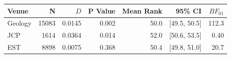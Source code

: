 \begin{tabular}{lrrrrrr}
  \toprule
Venue & N & $D$ & P Value & Mean Rank & 95\% CI & $BF_{01}$ \\ 
  \midrule
Geology & 15083 & 0.0145 & 0.002 & 50.0 & [49.5, 50.5] & 112.3 \\ 
JCP & 1614 & 0.0364 & 0.014 & 52.0 & [50.6, 53.5] & 0.40 \\ 
EST & 8898 & 0.0075 & 0.368 & 50.4 & [49.8, 51.0] & 20.7 \\ 
   \bottomrule
\end{tabular}
